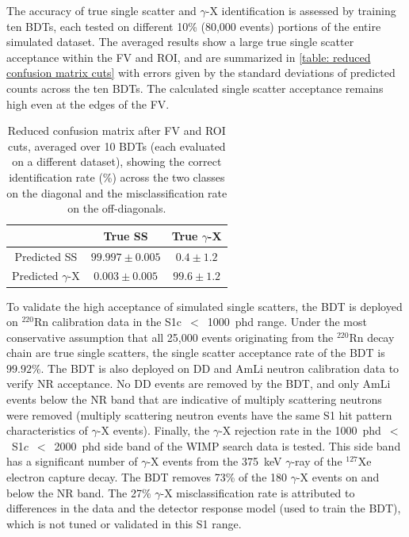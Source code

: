 \documentclass[reprint, showpacs,
preprintnumbers,
amsmath,amssymb,
aps, floatfix,
superscriptaddress,
prd, nofootinbib]{revtex4-1}
\begin{document}
\par
The accuracy of true single scatter and $\gamma$-X identification is assessed by training ten BDTs, each tested on different 10\% (80,000 events) portions of the entire simulated dataset. 
The averaged results show a large true single scatter acceptance within the FV and ROI, and are summarized in \autoref{table: reduced confusion matrix cuts} with errors given by the standard deviations of predicted counts across the ten BDTs. 
The calculated single scatter acceptance remains high even at the edges of the FV. 
\begin{table}
    \begin{center}
    \caption{Reduced confusion matrix after FV and ROI cuts, averaged over 10 BDTs (each evaluated on a different dataset), showing the correct identification rate (\%) across the two classes on the diagonal and the misclassification rate on the off-diagonals.}
        \begin{ruledtabular}
            \begin{tabular}{c|cc}
                 & True SS & True $\gamma$-X \\
                \hline
                Predicted SS & $99.997 \pm 0.005$ & $0.4 \pm 1.2$ \\
                Predicted $\gamma$-X & $0.003 \pm 0.005$ & $99.6 \pm 1.2$ \\
            \end{tabular}
        \end{ruledtabular}
    \end{center}
    \label{table: reduced confusion matrix cuts}
\end{table}
To validate the high acceptance of simulated single scatters, the BDT is deployed on $^{220}$Rn calibration data in the S1c~$<$~1000~phd range.
Under the most conservative assumption that all 25,000 events originating from the $^{220}$Rn decay chain are true single scatters, the single scatter acceptance rate of the BDT is $99.92$\%. 
The BDT is also deployed on DD and AmLi neutron calibration data to verify NR acceptance. 
No DD events are removed by the BDT, and only AmLi events below the NR band that are indicative of multiply scattering neutrons were removed (multiply scattering neutron events have the same S1 hit pattern characteristics of $\gamma$-X events). 
Finally, the $\gamma$-X rejection rate in the 1000~phd~$<$~S1$c$~$<$~2000~phd side band of the WIMP search data is tested.
This side band has a significant number of $\gamma$-X events from the 375~keV $\gamma$-ray of the $^{127}$Xe electron capture decay.
The BDT removes 73\% of the 180 $\gamma$-X events on and below the NR band.
The 27\% $\gamma$-X misclassification rate is attributed to differences in the data and the detector response model (used to train the BDT), which is not tuned or validated in this S1 range. 
\end{document}
